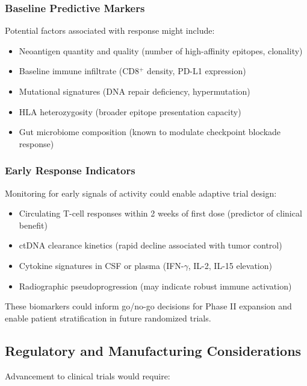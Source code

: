 \documentclass[12pt]{article}
\begin{document}
\subsubsection{Baseline Predictive Markers}
Potential factors associated with response might include:
\begin{itemize}[leftmargin=*,noitemsep]
\item Neoantigen quantity and quality (number of high-affinity epitopes, clonality)
\item Baseline immune infiltrate (CD8$^+$ density, PD-L1 expression)
\item Mutational signatures (DNA repair deficiency, hypermutation)
\item HLA heterozygosity (broader epitope presentation capacity)
\item Gut microbiome composition (known to modulate checkpoint blockade response)
\end{itemize}

\subsubsection{Early Response Indicators}
Monitoring for early signals of activity could enable adaptive trial design:
\begin{itemize}[leftmargin=*,noitemsep]
\item Circulating T-cell responses within 2 weeks of first dose (predictor of clinical benefit)
\item ctDNA clearance kinetics (rapid decline associated with tumor control)
\item Cytokine signatures in CSF or plasma (IFN-$\gamma$, IL-2, IL-15 elevation)
\item Radiographic pseudoprogression (may indicate robust immune activation)
\end{itemize}

These biomarkers could inform go/no-go decisions for Phase II expansion and enable patient stratification in future randomized trials.

\subsection{Regulatory and Manufacturing Considerations}
Advancement to clinical trials would require:
\end{document}
